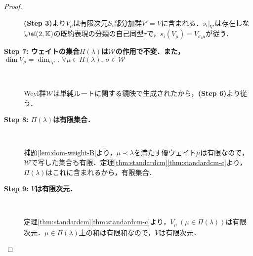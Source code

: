 \documentclass[rep_main]{subfiles}
\begin{document}
\begin{proof}
\begin{description}
		\textbf{(Step 3)}より$V_\mu$は有限次元$S_i$部分加群$V' = V$に含まれる．$s_i|_{V'}$は存在しない$\mathfrak{sl}(2, \mathbb{K})$の既約表現の分類の自己同型$\tau$で，$s_i(V_\mu) = V_{\sigma_i\mu}$が従う．
		\item[\textbf{Step 7: ウェイトの集合$\Pi(\lambda)$は$\mathscr{W}$の作用で不変．また，$\dim V_\mu = \dim_{\sigma\mu},\ \forall \mu \in \Pi(\lambda),\ \sigma \in \mathscr{W}$}]　
		
		Weyl群$\mathscr{W}$は単純ルートに関する鏡映で生成されたから，\textbf{(Step 6)}より従う．
		\item[\textbf{Step 8: $\Pi(\lambda)$は有限集合．}]　
			
		補題\ref{lem:dom-weight-B}より，$\mu \prec \lambda$を満たす優ウェイト$\mu$は有限なので，$\mathscr{W}$で写した集合も有限．定理\ref{thm:standardcm}\ref{thm:standardcm-c}より，$\Pi(\lambda)$はこれに含まれるから，有限集合．
		\item[\textbf{Step 9: $V$は有限次元．}]　
		
		定理\ref{thm:standardcm}\ref{thm:standardcm-c}より，$V_\mu\ (\mu \in \Pi(\lambda))$は有限次元．$\mu \in \Pi(\lambda)$上の和は有限和なので，$V$は有限次元．
	\end{description}
\end{proof}
\end{document}
